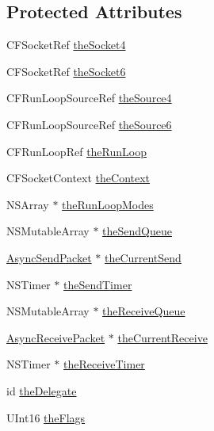 \subsection*{Protected Attributes}
\begin{DoxyCompactItemize}
\item 
CFSocketRef \hyperlink{interface_async_udp_socket_a20f3d1f4bf10b95ab5e0c5b3265c5bee}{theSocket4}
\item 
CFSocketRef \hyperlink{interface_async_udp_socket_a94c7d0086b3d4a9495e0ef87bca42a22}{theSocket6}
\item 
CFRunLoopSourceRef \hyperlink{interface_async_udp_socket_a11ed80b25840f9c2e1fb11fb81516e9f}{theSource4}
\item 
CFRunLoopSourceRef \hyperlink{interface_async_udp_socket_afa4beb0b77a9fc1de8e37e665ef8ab99}{theSource6}
\item 
CFRunLoopRef \hyperlink{interface_async_udp_socket_a0df4eb574cfbcba161dc7589f8e9913e}{theRunLoop}
\item 
CFSocketContext \hyperlink{interface_async_udp_socket_a87c18d99a5efbb5389832677241c01e9}{theContext}
\item 
NSArray $\ast$ \hyperlink{interface_async_udp_socket_a12b4b7a67bd7a3c4a03a95117020aee4}{theRunLoopModes}
\item 
NSMutableArray $\ast$ \hyperlink{interface_async_udp_socket_a53f90f3fa05fcc0775b3b941799c0d63}{theSendQueue}
\item 
\hyperlink{interface_async_send_packet}{AsyncSendPacket} $\ast$ \hyperlink{interface_async_udp_socket_a670636f2bac217e87ef9840ce30eb5c1}{theCurrentSend}
\item 
NSTimer $\ast$ \hyperlink{interface_async_udp_socket_a250938cf3ea1f75b3677393e6cb464dc}{theSendTimer}
\item 
NSMutableArray $\ast$ \hyperlink{interface_async_udp_socket_a8461a181df1fb64915f467c9c0bc2798}{theReceiveQueue}
\item 
\hyperlink{interface_async_receive_packet}{AsyncReceivePacket} $\ast$ \hyperlink{interface_async_udp_socket_a97626f811e3aebe59e2c035cb07fb28b}{theCurrentReceive}
\item 
NSTimer $\ast$ \hyperlink{interface_async_udp_socket_abada5c7e39302439191504e9dac55532}{theReceiveTimer}
\item 
id \hyperlink{interface_async_udp_socket_a7e18c4829e83d7de259fa4c4cd78925b}{theDelegate}
\item 
UInt16 \hyperlink{interface_async_udp_socket_a0870b15c6ba4a8fbd05122ef3994c40e}{theFlags}
\item 

\end{DoxyCompactItemize}
